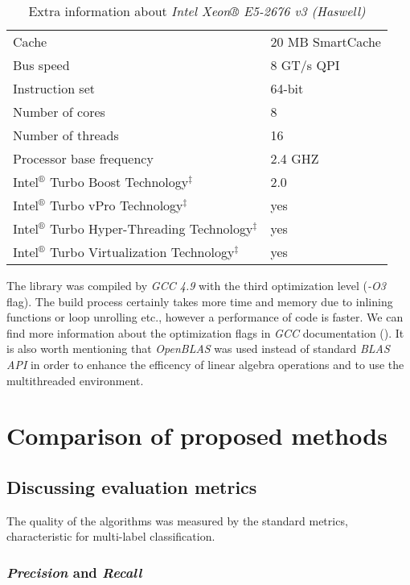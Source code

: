 \begin{table}[h]
\centering
\caption{Extra information about \textit{Intel Xeon® E5-2676 v3 (Haswell)}}
\label{tab:cpu}
    \begin{tabular}{l|l}
    & \\ \hline \hline
    Cache & 20 MB SmartCache \\
    Bus speed & 8 GT/s QPI \\
    Instruction set & 64-bit \\
    Number of cores & 8 \\
    Number of threads & 16 \\
    Processor base frequency & 2.4 GHZ \\
    Intel$^{®}$ Turbo Boost Technology$^{‡}$ & 2.0 \\
    Intel$^{®}$ Turbo vPro Technology$^{‡}$ & yes \\ 
    Intel$^{®}$ Turbo Hyper-Threading Technology$^{‡}$ & yes \\
    Intel$^{®}$ Turbo Virtualization Technology$^{‡}$ & yes
    \end{tabular}
\end{table}

The library was compiled by \textit{GCC 4.9} with the third optimization level (\textit{-O3} flag). The build process certainly takes more time and memory due to inlining functions or loop unrolling etc., however a performance of code is faster. We can find more information about the optimization flags in \textit{GCC} documentation (\cite{Opt}). It is also worth mentioning that \textit{OpenBLAS} was used instead of standard \textit{BLAS} \textit{API} in order to enhance the efficency of linear algebra operations and to use the multithreaded environment. 

\section{Comparison of proposed methods}
\subsection{Discussing evaluation metrics}


The quality of the algorithms was measured by the standard metrics, characteristic for multi-label classification.

\subsubsection{\textit{Precision} and \textit{Recall}} 

